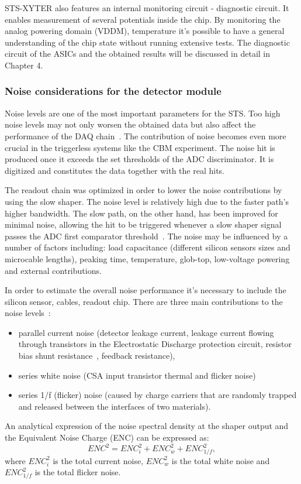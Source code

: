 STS-XYTER also features an internal monitoring circuit - diagnostic circuit. It enables measurement of several potentials inside the chip. By monitoring the analog powering domain (VDDM), temperature it's possible to have a general understanding of the chip state without running extensive tests. The diagnostic circuit of the \glspl{ASIC} and the obtained results will be discussed in detail in Chapter 4.
\subsubsection{Noise considerations for the detector module}
Noise levels are one of the most important parameters for the \gls{STS}. Too high noise levels may not only worsen the obtained data but also affect the performance of the \gls{DAQ} chain~\cite{Heuser:54798}. The contribution of noise becomes even more crucial in the triggerless systems like the \gls{CBM} experiment. The noise hit is produced once it exceeds the set thresholds of the \gls{ADC} discriminator. It is digitized and constitutes the data together with the real hits.

The readout chain was optimized in order to lower the noise contributions by using the slow shaper. The noise level is relatively high due to the faster path's higher bandwidth. The slow path, on the other hand, has been improved for minimal noise, allowing the hit to be triggered whenever a slow shaper signal passes the ADC first comparator threshold~\cite{RodriguezRodriguez2020}. The noise may be influenced by a number of factors including: load capacitance 
(different silicon sensors sizes and microcable lengths), peaking time, temperature, glob-top, low-voltage powering and external contributions.

In order to estimate the overall noise performance it's necessary to include the silicon sensor, cables, readout chip. There are three main contributions to the noise levels~\cite{Toia:209729}:
\begin{itemize}
    \item parallel current noise (detector leakage current, leakage current flowing through transistors in the Electrostatic Discharge protection circuit, resistor bias shunt resistance~\cite{Spieler}, feedback resistance),
    \item series white noise (\gls{CSA} input transistor thermal and flicker noise)
    \item series 1/f (flicker) noise (caused by charge carriers that are randomly trapped and released between the interfaces of two materials).
\end{itemize}
An analytical expression of the noise spectral density at the shaper output and the Equivalent Noise Charge (\gls{ENC}) can be expressed as:
\begin{equation}
    ENC^{2} = ENC^{2}_{i} + ENC^{2}_{w} + ENC^{2}_{1/f},
\end{equation}
where $ENC^{2}_{i}$  is the total current noise, $ ENC^{2}_{w}$ is the total white noise and $ENC^{2}_{1/f}$ is the total flicker noise. 

